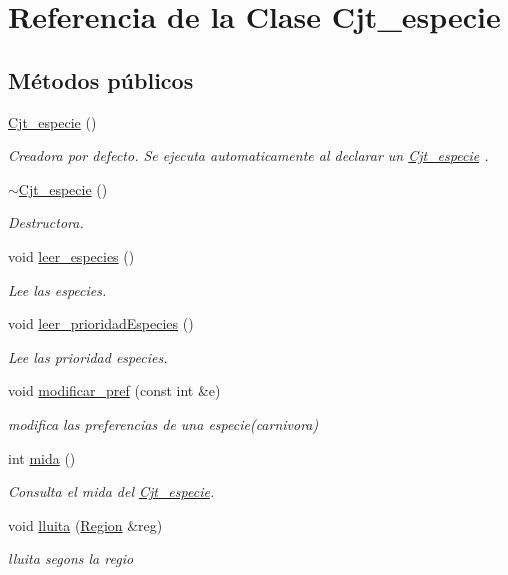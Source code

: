 \hypertarget{class_cjt__especie}{
\section{\-Referencia de la \-Clase \-Cjt\-\_\-especie}
\label{class_cjt__especie}
}
\subsection*{\-Métodos públicos}
\begin{DoxyCompactItemize}
\item 
\hyperlink{class_cjt__especie_aeb91166ea9322b0cb991e983e8ea249d}{\-Cjt\-\_\-especie} ()
\begin{DoxyCompactList}\small\item\em \-Creadora por defecto. \-Se ejecuta automaticamente al declarar un \hyperlink{class_cjt__especie}{\-Cjt\-\_\-especie} . \end{DoxyCompactList}\item 
\hyperlink{class_cjt__especie_ae870d351a6afbc205de1ef64bae49a23}{$\sim$\-Cjt\-\_\-especie} ()
\begin{DoxyCompactList}\small\item\em \-Destructora. \end{DoxyCompactList}\item 
void \hyperlink{class_cjt__especie_a505a4da1e941330a3c0321d7a569cb53}{leer\-\_\-especies} ()
\begin{DoxyCompactList}\small\item\em \-Lee las especies. \end{DoxyCompactList}\item 
void \hyperlink{class_cjt__especie_aa32d786019d85d99e3b9e23e9dd2e6a7}{leer\-\_\-prioridad\-Especies} ()
\begin{DoxyCompactList}\small\item\em \-Lee las prioridad especies. \end{DoxyCompactList}\item 
void \hyperlink{class_cjt__especie_aa42e86efda923327c7386b945f9ba8d5}{modificar\-\_\-pref} (const int \&e)
\begin{DoxyCompactList}\small\item\em modifica las preferencias de una especie(carnivora) \end{DoxyCompactList}\item 
int \hyperlink{class_cjt__especie_ab5f69bc32b4238d573a202fc733d95e2}{mida} ()
\begin{DoxyCompactList}\small\item\em \-Consulta el mida del \hyperlink{class_cjt__especie}{\-Cjt\-\_\-especie}. \end{DoxyCompactList}\item 
void \hyperlink{class_cjt__especie_af290b299379379d0469e68f447a24949}{lluita} (\hyperlink{class_region}{\-Region} \&reg)
\begin{DoxyCompactList}\small\item\em lluita segons la regio \end{DoxyCompactList}\end{DoxyCompactItemize}


